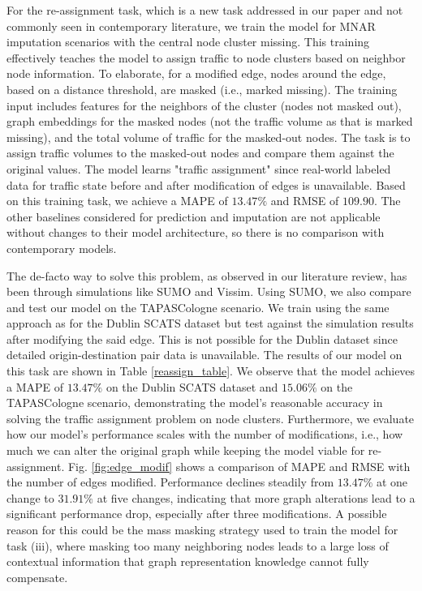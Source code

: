 For the re-assignment task, which is a new task addressed in our paper and not commonly seen in contemporary literature, we train the model for MNAR imputation scenarios with the central node cluster missing. This training effectively teaches the model to assign traffic to node clusters based on neighbor node information. To elaborate, for a modified edge, nodes around the edge, based on a distance threshold, are masked (i.e., marked missing). The training input includes features for the neighbors of the cluster (nodes not masked out), graph embeddings for the masked nodes (not the traffic volume as that is marked missing), and the total volume of traffic for the masked-out nodes. The task is to assign traffic volumes to the masked-out nodes and compare them against the original values. The model learns "traffic assignment" since real-world labeled data for traffic state before and after modification of edges is unavailable. Based on this training task, we achieve a MAPE of $13.47\%$ and RMSE of $109.90$. The other baselines considered for prediction and imputation are not applicable without changes to their model architecture, so there is no comparison with contemporary models.

The de-facto way to solve this problem, as observed in our literature review, has been through simulations like SUMO\cite{sumo} and Vissim\cite{vissim}. Using SUMO, we also compare and test our model on the TAPASCologne scenario. We train using the same approach as for the Dublin SCATS dataset but test against the simulation results after modifying the said edge. This is not possible for the Dublin dataset since detailed origin-destination pair data is unavailable. The results of our model on this task are shown in Table \ref{reassign_table}. We observe that the model achieves a MAPE of $13.47\%$ on the Dublin SCATS dataset and $15.06\%$ on the TAPASCologne scenario, demonstrating the model's reasonable accuracy in solving the traffic assignment problem on node clusters. Furthermore, we evaluate how our model's performance scales with the number of modifications, i.e., how much we can alter the original graph while keeping the model viable for re-assignment. Fig. \ref{fig:edge_modif} shows a comparison of MAPE and RMSE with the number of edges modified. Performance declines steadily from $13.47\%$ at one change to $31.91\%$ at five changes, indicating that more graph alterations lead to a significant performance drop, especially after three modifications. A possible reason for this could be the mass masking strategy used to train the model for task (iii), where masking too many neighboring nodes leads to a large loss of contextual information that graph representation knowledge cannot fully compensate.


